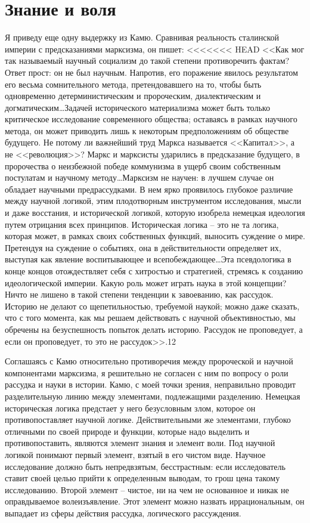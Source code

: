 \documentclass{book}
\begin{document}
\section{Знание и воля}

Я приведу еще одну выдержку из Камю. Сравнивая реальность сталинской империи с предсказаниями марксизма, он пишет:
<<<<<<< HEAD
<<Как мог так называемый научный социализм до такой степени противоречить фактам? Ответ прост: он не был научным. Напротив, его поражение явилось результатом его весьма сомнительного метода, претендовавшего на то, чтобы быть одновременно детерминистическим и пророческим, диалектическим и догматическим\ldots Задачей исторического материализма может быть только критическое исследование современного общества; оставаясь в рамках научного метода, он может приводить лишь к некоторым предположениям об обществе будущего. Не потому ли важнейший труд Маркса называется <<Капитал>>, а не <<революция>>? Маркс и марксисты ударились в предсказание будущего, в пророчества о неизбежной победе коммунизма в ущерб своим собственным постулатам и научному методу\ldots Марксизм не научен: в лучшем случае он обладает научными предрассудками. В нем ярко проявилось глубокое различие между научной логикой, этим плодотворным инструментом исследования, мысли и даже восстания, и исторической логикой, которую изобрела немецкая идеология путем отрицания всех принципов. Историческая логика -- это не та логика, которая может, в рамках своих собственных функций, выносить сужде­ние о мире. Претендуя на суждение о событиях, она в действи­тельности определяет их, выступая как явление воспитывающее и всепобеждающее\ldots Эта псевдологика в конце концов отождествляет себя с хитростью и стратегией, стремясь к созданию идеологической империи. Какую роль может играть наука в этой концепции? Ничто не лишено в такой степени тенденции к завоеванию, как рассудок. Историю не делают со щепетиль­ностью, требуемой наукой; можно даже сказать, что с того мо­мента, как мы решаем действовать с научной объективностью, мы обречены на безуспешность попыток делать историю. Рас­судок не проповедует, а если он проповедует, то это не рассу­док>>.12

Соглашаясь с Камю относительно противоречия между пророческой и научной компонентами марксизма, я решительно не согласен с ним по вопросу о роли рассудка и науки в истории. Камю, с моей точки зрения, неправильно проводит разделительную линию между элементами, подлежащими разделению. Немецкая историческая логика предстает у него безусловным злом, которое он противопоставляет научной логике. Действительными же элементами, глубоко отличными по своей природе и функции, которые надо выделить и противопоставить, являются элемент знания и элемент воли. Под научной логикой понимают первый элемент, взятый в его чистом виде. Научное исследование должно быть непредвзятым, бесстрастным: если исследователь ставит своей целью прийти к определенным выводам, то грош цена такому исследованию. Второй элемент -- чистое, ни на чем не основанное и никак не оправдываемое волеизъявление. Этот элемент можно назвать иррациональным, он выпадает из сферы действия рассудка, логического рассуждения.
\end{document}
